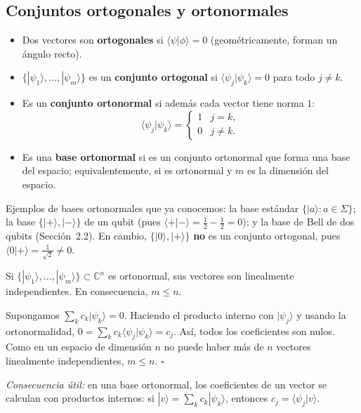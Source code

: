 \documentclass[11pt, a4paper, twoside, openright]{report}
\begin{document}
\subsection{Conjuntos ortogonales y ortonormales}

\begin{tcolorbox}[colback=teal!5!white,colframe=teal!75!black,title=\textbf{Definiciones}]
\begin{itemize}
    \item Dos vectores son \textbf{ortogonales} si $\langle\psi|\phi\rangle = 0$ (geométricamente, forman un ángulo recto).
    \item $\{|\psi_1\rangle,\dots,|\psi_m\rangle\}$ es un \textbf{conjunto ortogonal} si $\langle\psi_j|\psi_k\rangle = 0$ para todo $j\neq k$.
    \item Es un \textbf{conjunto ortonormal} si además cada vector tiene norma $1$:
    \[ \langle\psi_j|\psi_k\rangle = \begin{cases}1 & j = k,\\ 0 & j\neq k.\end{cases} \]
    \item Es una \textbf{base ortonormal} si es un conjunto ortonormal que forma una base del espacio; equivalentemente, si es ortonormal y $m$ es la dimensión del espacio.
\end{itemize}
\end{tcolorbox}

\noindent Ejemplos de bases ortonormales que ya conocemos: la base estándar $\{|a\rangle: a\in\Sigma\}$; la base $\{|+\rangle,|-\rangle\}$ de un qubit (pues $\langle+|-\rangle = \frac12 - \frac12 = 0$); y la base de Bell de dos qubits (Sección~2.2). En cambio, $\{|0\rangle,|+\rangle\}$ \textbf{no} es un conjunto ortogonal, pues $\langle0|+\rangle = \frac{1}{\sqrt2}\neq0$.

\begin{tcolorbox}[colback=teal!5!white,colframe=teal!75!black,title=\textbf{Proposición: Los conjuntos ortonormales son linealmente independientes}]
Si $\{|\psi_1\rangle,\dots,|\psi_m\rangle\}\subset\mathbb{C}^n$ es ortonormal, sus vectores son linealmente independientes. En consecuencia, $m\le n$.
\end{tcolorbox}

\begin{tcolorbox}[colback=gray!5!white,colframe=gray!75!black,title=\textbf{Demostración}]
Supongamos $\sum_k c_k|\psi_k\rangle = 0$. Haciendo el producto interno con $|\psi_j\rangle$ y usando la ortonormalidad, $0 = \sum_k c_k\langle\psi_j|\psi_k\rangle = c_j$. Así, todos los coeficientes son nulos. Como en un espacio de dimensión $n$ no puede haber más de $n$ vectores linealmente independientes, $m\le n$. \hfill $\square$

\textit{Consecuencia útil:} en una base ortonormal, los coeficientes de un vector se calculan con productos internos: si $|v\rangle = \sum_k c_k|\psi_k\rangle$, entonces $c_j = \langle\psi_j|v\rangle$.
\end{tcolorbox}
\end{document}
